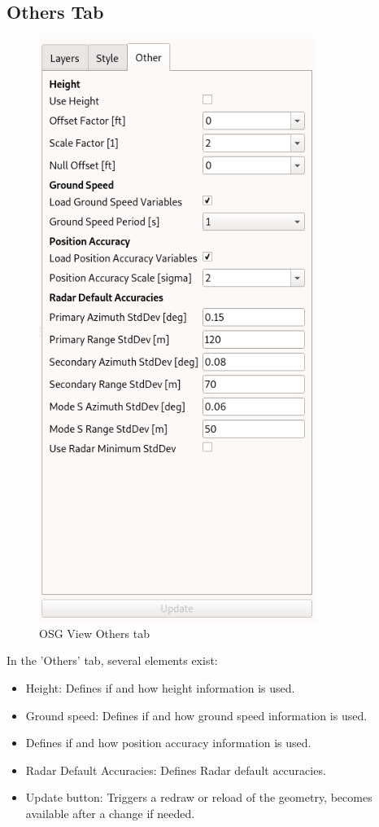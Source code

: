 \subsection{Others Tab}

\begin{figure}[H]
   \center
    \includegraphics[width=9cm,frame]{../screenshots/osgview_others_tab.png}
  \caption{OSG View Others tab}
\end{figure}

In the 'Others' tab, several elements exist:

\begin{itemize}
 \item Height: Defines if and how height information is used.
 \item Ground speed: Defines if and how ground speed information is used.
 \item Defines if and how position accuracy information is used.
 \item Radar Default Accuracies: Defines Radar default accuracies.
 \item Update button: Triggers a redraw or reload of the geometry, becomes available after a change if needed.
\end{itemize} 

